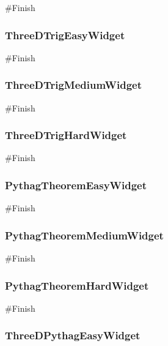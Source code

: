 \begin{landscape}
\begin{python}
#Finish
\end{python}

\subsubsection{ThreeDTrigEasyWidget}

\begin{python}
#Finish
\end{python}

\subsubsection{ThreeDTrigMediumWidget}

\begin{python}
#Finish
\end{python}

\subsubsection{ThreeDTrigHardWidget}

\begin{python}
#Finish
\end{python}

\subsubsection{PythagTheoremEasyWidget}

\begin{python}
#Finish
\end{python}

\subsubsection{PythagTheoremMediumWidget}

\begin{python}
#Finish
\end{python}

\subsubsection{PythagTheoremHardWidget}

\begin{python}
#Finish
\end{python}

\subsubsection{ThreeDPythagEasyWidget}


\end{landscape}
